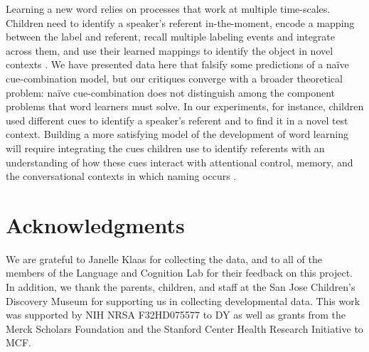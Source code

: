 \documentclass[man,floatsintext]{apa6}
\begin{document}
Learning a new word relies on processes that work at multiple time-scales. Children need to identify a speaker's referent in-the-moment, encode a mapping between the label and referent, recall multiple labeling events and integrate across them, and use their learned mappings to identify the object in novel contexts \cite{Frank2009a,McMurray2012, Yu2012b}. We have presented data here that falsify some predictions of a na\"ive cue-combination model, but our critiques converge with a broader theoretical problem: na\"{i}ve cue-combination does not distinguish among the component problems that word learners must solve. In our experiments, for instance, children used different cues to identify a speaker's referent and to find it in a novel test context. Building a more satisfying model of the development of word learning will require integrating the cues children use to identify referents with an understanding of how these cues interact with attentional control, memory, and the conversational contexts in which naming occurs \cite{Frank2013a, Yurovsky2013c}.

\section{Acknowledgments}

We are grateful to Janelle Klaas for collecting the data, and to  all of the members of the Language and Cognition Lab for their feedback on this project. In addition, we thank the parents, children, and staff at the San Jose Children's Discovery Museum for supporting us in collecting developmental data. This work was supported by NIH NRSA F32HD075577 to DY as well as grants from the Merck Scholars Foundation and the Stanford Center Health Research Initiative to MCF.



\end{document}
